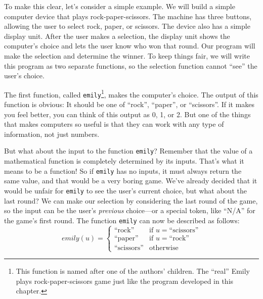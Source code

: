 To make this clear, let's consider a simple example.  We will build a
simple computer device that plays rock-paper-scissors.  The machine
has three buttons, allowing the user to select rock, paper, or
scissors.  The device also has a simple display unit.  After the user 
makes a selection, the display unit shows the computer's choice and
lets the user know who won that round.  Our program will make the
selection and determine the winner.  To keep things fair, we will
write this program as two separate functions, so the selection
function cannot ``see'' the user's choice.

The first function, called \texttt{emily}\footnote{This function is
named after one of the authors' children.  The ``real'' Emily
plays rock-paper-scissors game just like the program developed in this
chapter.}, makes the computer's choice.  The output of this function
is obvious: It should be one of ``rock'', ``paper'', or ``scissors''.
If it makes you feel better, you can think of this output as 0, 1, or 2.
But one of the things that makes computers so useful is that they can work
with any type of information, not just numbers.

But what about the input to the function \texttt{emily}?  Remember
that the value of a mathematical function is completely determined by
its inputs.  That's what it means to be a function! So if
\texttt{emily} has no inputs, it must always return the same value,
and that would be a very boring game.  We've already decided that it
would be unfair for \texttt{emily} to see the user's current choice,
but what about the last round?  We can make our selection by
considering the last round of the game, so the input can be the user's
\emph{previous} choice---or a special token, like ``N/A'' for the
game's first round.  The function \texttt{emily} can now be described
as follows:
\begin{displaymath}
emily(u) =
   \left\{
        \begin{array}{ll}
        \mbox{``rock''}     & \mbox{if } u = \mbox{``scissors''} \\
        \mbox{``paper''}    & \mbox{if } u = \mbox{``rock''} \\
        \mbox{``scissors''} & \mbox{otherwise}
        \end{array}     
   \right.
\end{displaymath}       

